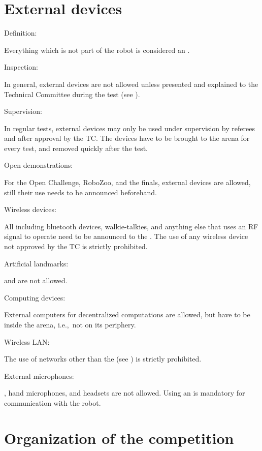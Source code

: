 \section{External devices}\label{rule:roobt_external_devices}
\begin{enumerate}
{\bf\item Definition:} Everything which is not part of the robot is considered an . 
{\bf\item Inspection:} In general, external devices are not allowed unless presented and explained to the Technical Committee during the  test (see ).
{\bf\item Supervision:} In regular tests, external devices may only be used under supervision by referees and after approval by the TC. The devices have to be brought to the arena for every test, and removed quickly after the test.
{\bf\item Open demonstrations:} For the Open Challenge, RoboZoo, and the finals, external devices are allowed, still their use needs to be announced beforehand.
{\bf\item Wireless devices:} All  including bluetooth devices, walkie-talkies, and anything else that uses an RF signal to operate need to be announced to the . The use of any wireless device not approved by the TC is strictly prohibited.  
{\bf\item Artificial landmarks:}  and  are not allowed.
{\bf\item Computing devices:} External computers for decentralized computations are allowed, but have to be inside the arena, i.e.,~not on its periphery.
{\bf\item Wireless LAN:} The use of networks other than the  (see ) is strictly prohibited.
{\bf\item External microphones: }, hand microphones, and headsets are not allowed. Using an  is mandatory for communication with the robot.
\end{enumerate}



\section{Organization of the competition}\label{sec:procedure_during_competition}

